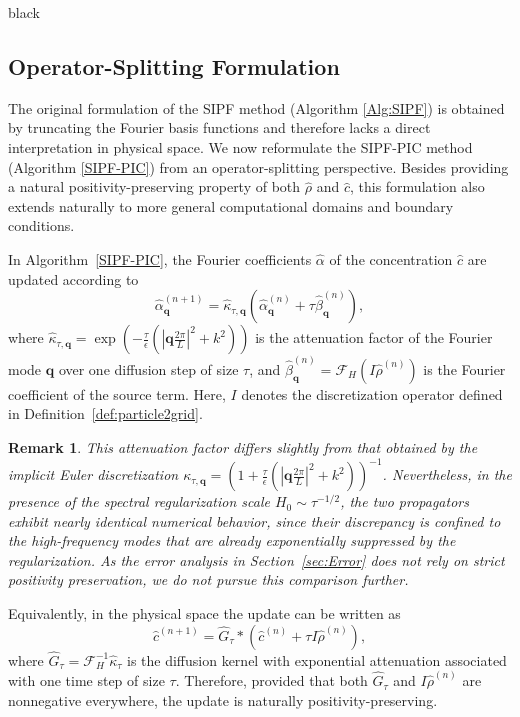 \documentclass[review,onefignum,onetabnum]{siamart250211}
\newtheorem{remark}[theorem]{Remark}
\begin{document}
\begin{color}{black}
\subsection{Operator-Splitting Formulation}
\label{subsec:os}
The original formulation of the SIPF method (Algorithm \ref{Alg:SIPF}) is obtained by truncating the Fourier basis functions and therefore lacks a direct interpretation in physical space. We now reformulate the SIPF-PIC method (Algorithm \ref{SIPF-PIC}) from an operator-splitting perspective. Besides providing a natural positivity-preserving property of both $\hat{\rho}$ and $\hat{c}$, this formulation also extends naturally to more general computational domains and boundary conditions.

In Algorithm~\ref{SIPF-PIC}, the Fourier coefficients $\hat{\alpha}$ of the concentration $\hat{c}$ are updated according to
\begin{equation}
\hat{\alpha}_{\mathbf q}^{(n+1)}
=
\hat{\kappa}_{\tau,\mathbf q}
\left(
\hat{\alpha}_{\mathbf q}^{(n)}
+
\tau \hat{\beta}_{\mathbf q}^{(n)}
\right),
\end{equation}
where $\hat{\kappa}_{\tau,\mathbf q}= \exp \left(-\frac{\tau}{\epsilon}\left(\left|\mathbf q\frac{2\pi}{L}\right|^2+k^2\right)\right)$ is the attenuation factor of the Fourier mode $\mathbf q$ over one diffusion step of size $\tau$, and $\hat{\beta}_{\mathbf q}^{(n)}=\mathcal{F}_H\!\left(I\hat{\rho}^{(n)}\right)$ is the Fourier coefficient of the source term. Here, $I$ denotes the discretization operator defined in Definition~\ref{def:particle2grid}.
\begin{remark}
This attenuation factor differs slightly from that obtained by the implicit Euler discretization \(
\kappa_{\tau,\mathbf q}
=
\left(
1+\frac{\tau}{\epsilon}
\left(
\left|\mathbf q\frac{2\pi}{L}\right|^2+k^2
\right)
\right)^{-1}\). Nevertheless, in the presence of the spectral regularization scale
$H_0\sim\tau^{-1/2}$, the two propagators exhibit nearly identical numerical behavior, since their discrepancy is confined to the high-frequency modes that are already exponentially suppressed by the regularization. As the error analysis in Section~\ref{sec:Error} does not rely on strict positivity preservation, we do not pursue this comparison further.    
\end{remark}

Equivalently, in the physical space the update can be written as
\begin{equation}
\hat{c}^{(n+1)}
=
\widehat{G}_{\tau}
*
\left(
\hat{c}^{(n)}
+
\tau I\hat{\rho}^{(n)}
\right),
\end{equation}
where $\widehat{G}_{\tau}=\mathcal{F}_H^{-1}\hat{\kappa}_{\tau}$ is the diffusion kernel with exponential attenuation associated with one time step of size $\tau$. Therefore, provided that both $\widehat{G}_{\tau}$ and $I\hat{\rho}^{(n)}$ are nonnegative everywhere, the update is naturally positivity-preserving.


\end{color}
\end{document}
